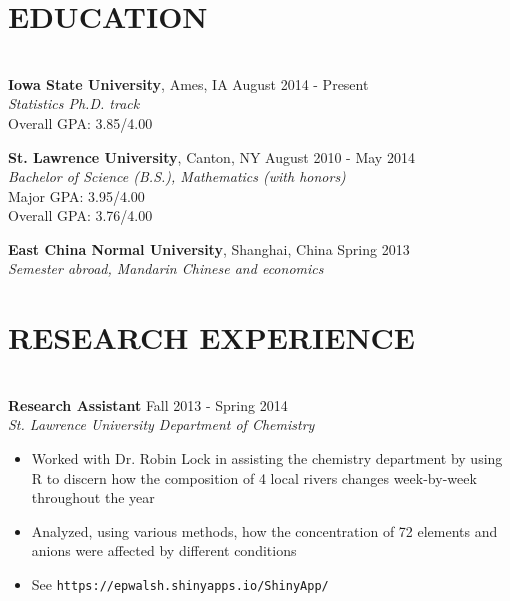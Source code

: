 \documentclass[10pt]{res} %
\begin{document}
\begin{resume}


\section{EDUCATION}

\hrulefill \\ %
{\bf Iowa State University}, Ames, IA \hfill August 2014 - Present \\
{\sl Statistics Ph.D. track} \\
Overall GPA: 3.85/4.00

{\bf St. Lawrence University}, Canton, NY \hfill August 2010 - May 2014 \\
{\sl Bachelor of Science (B.S.), Mathematics (with honors)} \\
Major GPA: 3.95/4.00 \\
Overall GPA: 3.76/4.00 

{\bf East China Normal University}, Shanghai, China \hfill Spring 2013 \\
{\sl Semester abroad, Mandarin Chinese and economics} 



\section{RESEARCH EXPERIENCE} 

\hrulefill \\
{\bf Research Assistant} \hfill Fall 2013 - Spring 2014 \\
{\sl St. Lawrence University Department of Chemistry } 
\begin{itemize} \itemsep -2pt %
\item Worked with Dr. Robin Lock in assisting the chemistry department by using R to discern how the composition of 4 local rivers changes week-by-week throughout the year
\item Analyzed, using various methods, how the concentration of 72 elements and anions were affected by different conditions
\item See \texttt{https://epwalsh.shinyapps.io/ShinyApp/}
\end{itemize}


\end{resume}
\end{document}
